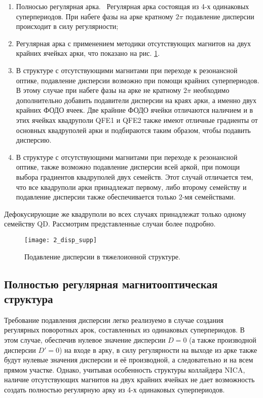 \begin{enumerate} 
\item	Полносью регулярная арка. \ Регулярная арка состоящая из 4-х одинаковых суперпериодов. При набеге фазы на арке кратному $2\pi$ подавление дисперсии происходит в силу регулярности;
\item Регулярная арка с применением методики отсутствующих магнитов на двух крайних ячейках арки, что показано на рис. \ref{fig:2_disp_supp}.
\item В структуре с отсутствующими магнитами при переходе к резонансной оптике, подавление дисперсии возможно при помощи крайних суперпериодов. В этому случае при набеге фазы на арке не кратному $2\pi$ необходимо дополнительно добавить подавители дисперсии на краях арки, а именно двух крайних ФОДО ячеек. Две крайние ФОДО ячейки отличаются наличием и в этих ячейках квадруполи QFE1 и QFE2 также имеют отличные градиенты от основных квадруполей арки и подбираются таким образом, чтобы подавить дисперсию.
\item В структуре с отсутствующими магнитами при переходе к резонансной оптике, также возможно подавление дисперсии всей аркой, при помощи выбора градиентов квадруполей двух семейств. Этот случай отличается тем, что все квадруполи арки принадлежат первому, либо второму семейству и подавление дисперсии также обеспечивается только 2-мя семействами.
\end{enumerate} 

\noindent Дефокусирующие же квадруполи во всех случаях принадлежат только одному семейству QD. Рассмотрим представленные случаи  более подробно.

\begin{figure} [h!]
	\center
	\texttt{[image: 2\_disp\_supp]}
	\caption{Подавление дисперсии в тяжелоионной структуре.}
	\label{fig:2_disp_supp}
\end{figure}

\subsection{Полностью регулярная магнитооптическая структура}\label{subsec:transition_variation/disp_supperssion/regular}

\par Требование подавления дисперсии легко реализуемо в случае создания регулярных поворотных арок, составленных из одинаковых суперпериодов. В этом случае, обеспечив нулевое значение дисперсии $D=0$ (а также производной дисперсии $D{\prime}=0$) на входе в арку, в силу регулярности на выходе из арке также будут нулевые значения дисперсии и её производной, а следовательно и на всем прямом участке. Однако, учитывая особенность структуры коллайдера NICA, наличие отсутствующих магнитов на двух крайних ячейках не дает возможность создать полностью регулярную арку из 4-х одинаковых суперпериодов.

